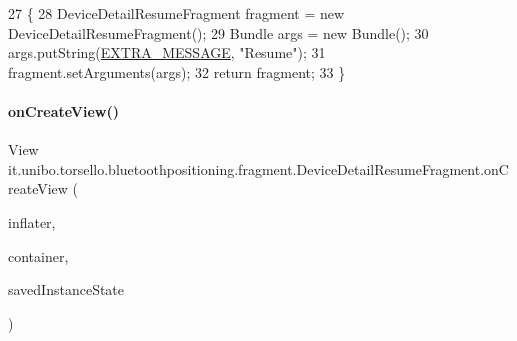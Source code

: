 \begin{DoxyCode}
27                                                            \{
28         DeviceDetailResumeFragment fragment = \textcolor{keyword}{new} DeviceDetailResumeFragment();
29         Bundle args = \textcolor{keyword}{new} Bundle();
30         args.putString(\hyperlink{classit_1_1unibo_1_1torsello_1_1bluetoothpositioning_1_1fragment_1_1DeviceDetailResumeFragment_a26b6bb100efe8bbb74e10fbd8deca47f_a26b6bb100efe8bbb74e10fbd8deca47f}{EXTRA\_MESSAGE}, \textcolor{stringliteral}{"Resume"});
31         fragment.setArguments(args);
32         \textcolor{keywordflow}{return} fragment;
33     \}
\end{DoxyCode}
\hypertarget{classit_1_1unibo_1_1torsello_1_1bluetoothpositioning_1_1fragment_1_1DeviceDetailResumeFragment_ac6332cf63f2ea0f1276b031c1b17537f_ac6332cf63f2ea0f1276b031c1b17537f}{}\label{classit_1_1unibo_1_1torsello_1_1bluetoothpositioning_1_1fragment_1_1DeviceDetailResumeFragment_ac6332cf63f2ea0f1276b031c1b17537f_ac6332cf63f2ea0f1276b031c1b17537f} 
\paragraph{\texorpdfstring{on\+Create\+View()}{onCreateView()}}
{\footnotesize\ttfamily View it.\+unibo.\+torsello.\+bluetoothpositioning.\+fragment.\+Device\+Detail\+Resume\+Fragment.\+on\+Create\+View (\begin{DoxyParamCaption}\item[{Layout\+Inflater}]{inflater,  }\item[{View\+Group}]{container,  }\item[{Bundle}]{saved\+Instance\+State }\end{DoxyParamCaption})}


